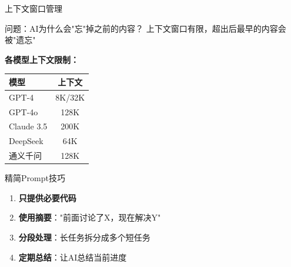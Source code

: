 \begin{frame}{上下文窗口管理}
	\tiny
	\begin{alertblock}{问题：AI为什么会"忘"掉之前的内容？}
		上下文窗口有限，超出后最早的内容会被"遗忘"
	\end{alertblock}

	\textbf{各模型上下文限制：}
	\begin{table}
		\centering
		\tiny
		\begin{tabular}{lc}
			\toprule
			\textbf{模型} & \textbf{上下文} \\
			\midrule
			GPT-4 & 8K/32K \\
			GPT-4o & 128K \\
			Claude 3.5 & 200K \\
			DeepSeek & 64K \\
			通义千问 & 128K \\
			\bottomrule
		\end{tabular}
	\end{table}
\end{frame}

\begin{frame}{精简Prompt技巧}
	\tiny
	\vspace{-0.8cm}
	\begin{enumerate}
		\item \textbf{只提供必要代码}
		\item \textbf{使用摘要}："前面讨论了X，现在解决Y"
		\item \textbf{分段处理}：长任务拆分成多个短任务
		\item \textbf{定期总结}：让AI总结当前进度
	\end{enumerate}
\end{frame}
